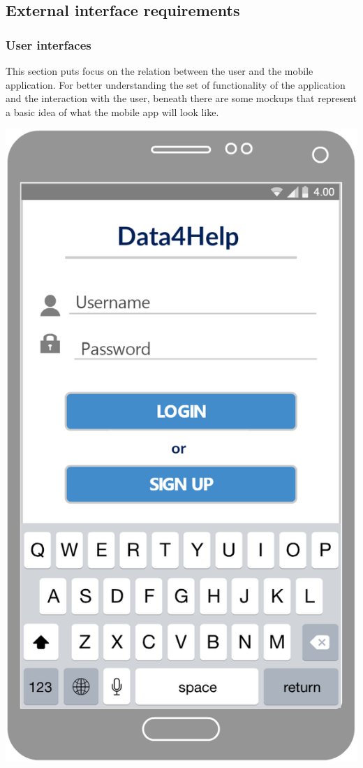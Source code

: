 \subsection{External interface requirements}
\subsubsection{User interfaces}
This section puts focus on the relation between the user and the mobile application. For better understanding the set of functionality of the application and the interaction with the user, beneath there are some mockups that represent a basic idea of what the mobile app will look like.

\begin{center}
\begin{minipage}[c]{.40\textwidth}
\centering
\includegraphics[width=1\textwidth]{Images/userInterface/Login}

\end{minipage}
\end{center}
